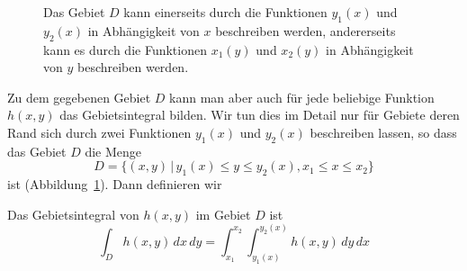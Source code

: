 \begin{figure}
\centering
{}
\caption{Das Gebiet $D$ kann einerseits durch die Funktionen
$y_1(x)$ und $y_2(x)$ in Abhängigkeit von $x$ beschreiben werden,
andererseits kann es durch die Funktionen
$x_1(y)$ und $x_2(y)$ in Abhängigkeit von $y$ beschreiben werden.
\label{skript:kruemmung:gebiet}}
\end{figure}
Zu dem gegebenen Gebiet $D$ kann man aber auch für jede beliebige
Funktion $h(x,y)$ das Gebietsintegral bilden.
Wir tun dies im Detail nur für Gebiete deren Rand sich durch zwei
Funktionen $y_1(x)$ und $y_2(x)$ beschreiben lassen, so dass das
Gebiet $D$ die Menge
\[
D=\{ (x,y) \,|\, y_1(x) \le y \le y_2(x), x_1\le x\le x_2\}
\]
ist (Abbildung~\ref{skript:kruemmung:gebiet}).
Dann definieren wir

\begin{definition}
Das Gebietsintegral von $h(x,y)$ im Gebiet $D$ ist
\[
\int_D h(x,y)\,dx\,dy = \int_{x_1}^{x_2} \int_{y_1(x)}^{y_2(x)} h(x,y)\,dy\,dx
\]
\end{definition}

